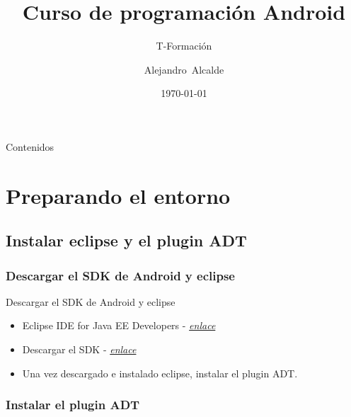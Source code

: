 \documentclass{beamer}
\title{Curso de programación Android}
\subtitle{T-Formación}
\author{Alejandro~Alcalde}
\institute[Estudiante de la ETSIIT] %
{
  \href{http://elbauldelprogramador.com}{elbauldelprogramador.com}}
\date{\today}
\begin{document}
\begin{frame}
  \titlepage
\end{frame}

\begin{frame}{Contenidos}
  \tableofcontents
\end{frame}

\section{Preparando el entorno}

\subsection{Instalar eclipse y el plugin ADT}

\subsubsection{Descargar el SDK de Android y eclipse}

\begin{frame}{Descargar el SDK de Android y eclipse}{}
  \begin{itemize}
  \item {
    Eclipse IDE for Java EE Developers - \href{http://www.eclipse.org/downloads/packages/eclipse-ide-java-ee-developers/keplersr2}{\textit{enlace}}
  }
  \item {
    Descargar el SDK - \href{http://developer.android.com/sdk/index.html\#ExistingIDE}{\textit{enlace}}
  }
  \item{
    Una vez descargado e instalado eclipse, instalar el plugin ADT.
  }
  \end{itemize}
\end{frame}

\subsubsection{Instalar el plugin ADT}
\end{document}
